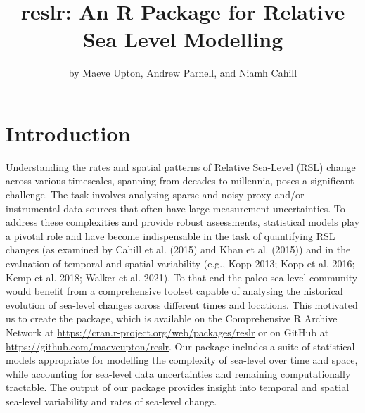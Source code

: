 \title{reslr: An R Package for Relative Sea Level Modelling}


\author{by Maeve Upton, Andrew Parnell, and Niamh Cahill}

\maketitle


\hypertarget{introduction}{%
\section{Introduction}\label{introduction}}

Understanding the rates and spatial patterns of Relative Sea-Level (RSL) change across various timescales, spanning from decades to millennia, poses a significant challenge. The task involves analysing sparse and noisy proxy and/or instrumental data sources that often have large measurement uncertainties. To address these complexities and provide robust assessments, statistical models play a pivotal role and have become indispensable in the task of quantifying RSL changes (as examined by Cahill et al. (2015) and Khan et al. (2015)) and in the evaluation of temporal and spatial variability (e.g., Kopp 2013; Kopp et al. 2016; Kemp et al. 2018; Walker et al. 2021). To that end the paleo sea-level community would benefit from a comprehensive toolset capable of analysing the historical evolution of sea-level changes across different times and locations. This motivated us to create the  package, which is available on the Comprehensive R Archive Network at \url{https://cran.r-project.org/web/packages/reslr} or on GitHub at \url{https://github.com/maeveupton/reslr}. Our package includes a suite of statistical models appropriate for modelling the complexity of sea-level over time and space, while accounting for sea-level data uncertainties and remaining computationally tractable. The output of our package provides insight into temporal and spatial sea-level variability and rates of sea-level change.

